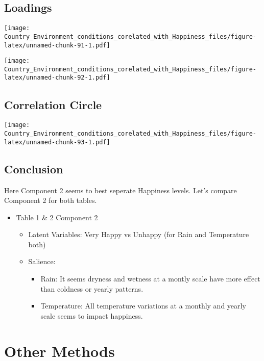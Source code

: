 \documentclass[]{book}
\providecommand{\tightlist}{%
  \setlength{\itemsep}{0pt}\setlength{\parskip}{0pt}}
\begin{document}
\hypertarget{loadings-4}{%
\section{Loadings}\label{loadings-4}}

\texttt{[image: Country\_Environment\_conditions\_corelated\_with\_Happiness\_files/figure-latex/unnamed-chunk-91-1.pdf]}

\texttt{[image: Country\_Environment\_conditions\_corelated\_with\_Happiness\_files/figure-latex/unnamed-chunk-92-1.pdf]}

\hypertarget{correlation-circle}{%
\section{Correlation Circle}\label{correlation-circle}}

\texttt{[image: Country\_Environment\_conditions\_corelated\_with\_Happiness\_files/figure-latex/unnamed-chunk-93-1.pdf]}

\hypertarget{conclusion-5}{%
\section{Conclusion}\label{conclusion-5}}

Here Component 2 seems to best seperate Happiness levels. Let's compare
Component 2 for both tables.

\begin{itemize}
\tightlist
\item
  Table 1 \& 2 Component 2

  \begin{itemize}
  \tightlist
  \item
    Latent Variables: Very Happy vs Unhappy (for Rain and Temperature
    both)
  \item
    Salience:

    \begin{itemize}
    \tightlist
    \item
      Rain: It seems dryness and wetness at a montly scale have more
      effect than coldness or yearly patterns.
    \item
      Temperature: All temperature variations at a monthly and yearly
      scale seems to impact happiness.
    \end{itemize}
  \end{itemize}
\end{itemize}

\hypertarget{other-methods}{%
\chapter{Other Methods}\label{other-methods}}
\end{document}
